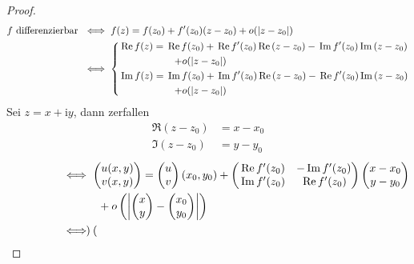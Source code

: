 \begin{theorem}[Satz]
  \begin{proof}
    \begin{align*}
      \text{$f$ differenzierbar } &\iff f(z) = f(z_0) + f'(z_0)(z-z_0) + o(|z-z_0|) \\
      &\iff
      \begin{dcases}
        \Re f(z) = \Re f(z_0) + \Re f'(z_0) \Re (z-z_0) - \Im f'(z_0) \Im (z-z_0) \\ \mspace{100mu} + o(|z-z_0|) \\
        \Im f(z) = \Im f(z_0) + \Im f'(z_0) \Re (z-z_0) - \Re f'(z_0) \Im (z-z_0) \\ \mspace{100mu} + o(|z-z_0|)
      \end{dcases}
    \end{align*}
    Sei $z = x + \mathrm{i} y$, dann zerfallen
    \begin{align*}
      \Re (z-z_0) &= x - x_0 \\
      \Im (z-z_0) &= y - y_0
    \end{align*}
    \begin{align*}
      \phantom{\text{\ref{itm:2.20 i}}} &\iff
      \begin{pmatrix}
        u(x,y) \\ v(x,y)
      \end{pmatrix}
      =
      \begin{pmatrix}
        u \\ v
      \end{pmatrix}
      (x_0,y_0) +
      \begin{pmatrix}
        \Re f'(z_0) & -\Im f'(z_0) \\
        \Im f'(z_0) & \Re f'(z_0)
      \end{pmatrix}
      \begin{pmatrix}
        x-x_0 \\
        y-y_0
      \end{pmatrix}\\
      &\phantom{\iff\quad}
      +
      o
      \left(\left|
      \begin{pmatrix}
        x \\ y
      \end{pmatrix}
      -
      \begin{pmatrix}
        x_0 \\ y_0
      \end{pmatrix}
      \right|\right) \\
      &\iff
      \begin{pmatrix}

\end{pmatrix}
\end{align*}
\end{proof}
\end{theorem}
